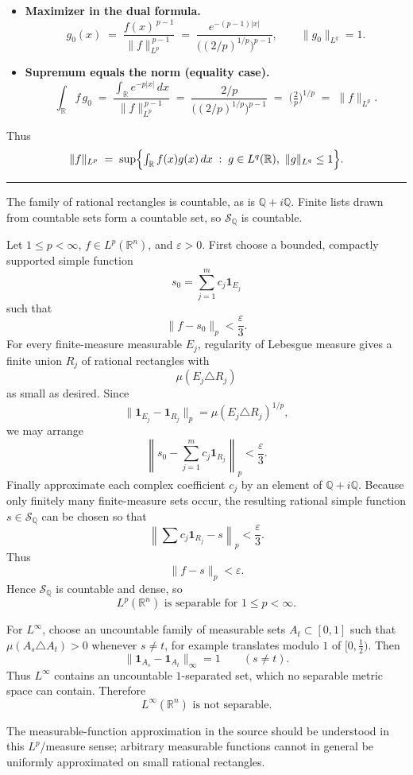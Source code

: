 \begin{problem}[CP-III-0010]
\begin{itemize}
	\item \textbf{Maximizer in the dual formula.}
	\[
	g_0(x) \;=\; \frac{f(x)^{\,p-1}}{\|f\|_{L^p}^{\,p-1}}
	\;=\; \frac{e^{-(p-1)|x|}}{\bigl((2/p)^{1/p}\bigr)^{p-1}},
	\qquad \|g_0\|_{L^q}=1.
	\]

	\item \textbf{Supremum equals the norm (equality case).}
	\[
	\int_{\mathbb{R}} f\,g_0
	\;=\; \frac{\int_{\mathbb{R}} e^{-p|x|}\,dx}{\|f\|_{L^p}^{\,p-1}}
	\;=\; \frac{2/p}{\bigl((2/p)^{1/p}\bigr)^{p-1}}
	\;=\; \bigl(\tfrac{2}{p}\bigr)^{1/p}
	\;=\; \|f\|_{L^p}.
	\]
\end{itemize}
Thus
\[
\|f\|_{L^p}
\;=\; \sup\Bigl\{\textstyle\int_{\mathbb{R}} f(x)g(x)\,dx \;:\; g\in L^q(\mathbb{R}),\ \|g\|_{L^q}\le 1\Bigr\}.
\]

\vspace{0.75\baselineskip}
\hrule
\vspace{0.75\baselineskip}
\end{problem}

\begin{solution}
The family of rational rectangles is countable, as is
\(\mathbb Q+i\mathbb Q\).  Finite lists drawn from countable sets form a
countable set, so \(\mathcal S_{\mathbb Q}\) is countable.

Let \(1\le p<\infty\), \(f\in L^p(\mathbb R^n)\), and
\(\varepsilon>0\).  First choose a bounded, compactly supported simple
function
\[
s_0=\sum_{j=1}^m c_j\mathbf1_{E_j}
\]
such that
\[
\|f-s_0\|_p<\frac{\varepsilon}{3}.
\]
For every finite-measure measurable \(E_j\), regularity of Lebesgue
measure gives a finite union \(R_j\) of rational rectangles with
\[
\mu(E_j\triangle R_j)
\]
as small as desired.  Since
\[
\|\mathbf1_{E_j}-\mathbf1_{R_j}\|_p
=
\mu(E_j\triangle R_j)^{1/p},
\]
we may arrange
\[
\left\|
s_0-\sum_{j=1}^m c_j\mathbf1_{R_j}
\right\|_p
<
\frac{\varepsilon}{3}.
\]
Finally approximate each complex coefficient \(c_j\) by an element of
\(\mathbb Q+i\mathbb Q\).  Because only finitely many finite-measure
sets occur, the resulting rational simple function
\(s\in\mathcal S_{\mathbb Q}\) can be chosen so that
\[
\left\|
\sum c_j\mathbf1_{R_j}-s
\right\|_p
<
\frac{\varepsilon}{3}.
\]
Thus
\[
\|f-s\|_p<\varepsilon.
\]
Hence \(\mathcal S_{\mathbb Q}\) is countable and dense, so
\[
\boxed{L^p(\mathbb R^n)\text{ is separable for }1\le p<\infty.}
\]

For \(L^\infty\), choose an uncountable family of measurable sets
\(A_t\subset[0,1]\) such that
\(\mu(A_s\triangle A_t)>0\) whenever \(s\neq t\), for example translates
modulo \(1\) of \([0,\tfrac12)\).  Then
\[
\|\mathbf1_{A_s}-\mathbf1_{A_t}\|_\infty=1
\qquad(s\neq t).
\]
Thus \(L^\infty\) contains an uncountable \(1\)-separated set, which no
separable metric space can contain.  Therefore
\[
\boxed{L^\infty(\mathbb R^n)\text{ is not separable}.}
\]

The measurable-function approximation in the source should be understood
in this \(L^p\)/measure sense; arbitrary measurable functions cannot in
general be uniformly approximated on small rational rectangles.
\end{solution}


